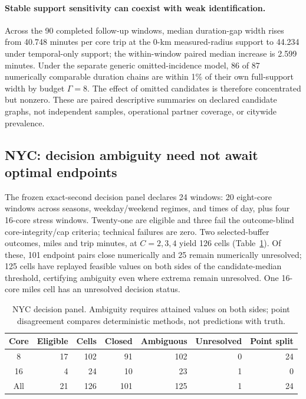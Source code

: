 \paragraph{Stable support sensitivity can coexist with weak identification.}
Across the 90 completed follow-up windows, median duration-gap width rises
from 40.748 minutes per core trip at the 0-km measured-radius support to 44.234
under temporal-only support; the within-window paired median increase is 2.599
minutes. Under the separate generic omitted-incidence model, 86 of 87
numerically comparable duration chains are within 1\% of their own
full-support width by budget $\Gamma=8$. The effect of omitted candidates is
therefore concentrated but nonzero. These are paired descriptive summaries
on declared candidate graphs, not independent samples, operational partner
coverage, or citywide prevalence.

\subsection{NYC: decision ambiguity need not await optimal endpoints}
The frozen exact-second decision panel declares 24 windows: 20 eight-core
windows across seasons, weekday/weekend regimes, and times of day, plus four
16-core stress windows. Twenty-one are eligible and three fail the
outcome-blind core-integrity/cap criteria; technical failures are zero.
Two selected-buffer outcomes, miles and trip minutes, at $C=2,3,4$ yield 126
cells (Table~\ref{tab:decisionpanel}). Of these, 101 endpoint pairs close
numerically and 25 remain numerically unresolved;
125 cells have replayed feasible values on both sides of the candidate-median
threshold, certifying ambiguity even where extrema remain unresolved.
One 16-core miles cell has an unresolved decision status.

\begin{table}[t]
\caption{NYC decision panel. Ambiguity requires attained values on both sides;
point disagreement compares deterministic methods, not predictions with truth.}
\label{tab:decisionpanel}
\centering
\scriptsize
\setlength{\tabcolsep}{2.5pt}
\begin{tabular}{@{}crrrrrr@{}}
\toprule
Core & Eligible & Cells & Closed & Ambiguous & Unresolved & Point split \\
\midrule
8 & 17 & 102 & 91 & 102 & 0 & 24 \\
16 & 4 & 24 & 10 & 23 & 1 & 0 \\
All & 21 & 126 & 101 & 125 & 1 & 24 \\
\bottomrule
\end{tabular}
\end{table}

